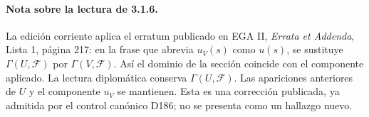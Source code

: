 \paragraph{Nota sobre la lectura de 3.1.6.}
La edición corriente aplica el erratum publicado en EGA II, \emph{Errata et Addenda}, Lista 1, página 217: en la frase que abrevia $u_V(s)$ como $u(s)$, se sustituye $\Gamma(U,\mathcal{F})$ por $\Gamma(V,\mathcal{F})$. Así el dominio de la sección coincide con el componente aplicado. La lectura diplomática conserva $\Gamma(U,\mathcal{F})$. Las apariciones anteriores de $U$ y el componente $u_V$ se mantienen. Esta es una corrección publicada, ya admitida por el control canónico D186; no se presenta como un hallazgo nuevo.
